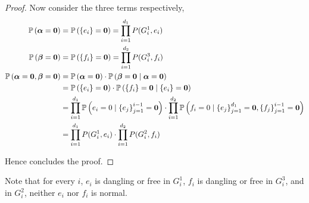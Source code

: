 \begin{proof}
Now consider the three terms respectively,
	\begin{align*}
		\mathbb{P}\left( \boldsymbol\alpha = \mathbf{0}\right) &= \mathbb{P} \left( \left\{e_i\right\} = \mathbf{0}\right) =	\prod_{i=1}^{d_1} P(G_i^1, e_i) \\
		\mathbb{P}\left( \boldsymbol\beta = \mathbf{0}\right) &= \mathbb{P} \left( \left\{f_i\right\} = \mathbf{0}\right) =	\prod_{i=1}^{d_2} P(G_i^3, f_i) \\
		\mathbb{P}\left( \boldsymbol\alpha = \mathbf{0}, \boldsymbol\beta = \mathbf{0} \right) &=  \mathbb{P} \left( \boldsymbol\alpha = \mathbf{0} \right) \cdot \mathbb{P}\left( \boldsymbol\beta = \mathbf{0} \mid \boldsymbol\alpha = \mathbf{0} \right) \\
		&=  \mathbb{P} \left( \left\{e_i\right\} = \mathbf{0}\right) \cdot \mathbb{P} \left( \left\{f_i\right\} = \mathbf{0} \mid \left\{e_i\right\} = \mathbf{0} \right) \\
		&= \prod_{i=1}^{d_1} \mathbb{P} \left( e_i = 0 \mid \left\{e_j\right\}_{j=1}^{i-1} = \mathbf{0} \right) \cdot \prod_{i=1}^{d_2} \mathbb{P} \left( f_i = 0 \mid \left\{e_j\right\}_{j=1}^{d_1} = \mathbf{0},\left\{f_j\right\}_{j=1}^{i-1} = \mathbf{0} \right) \\
		&= \prod_{i=1}^{d_1} P(G_i^1, e_i) \cdot \prod_{i=1}^{d_2} P(G_i^2, f_i)
	\end{align*}

	Hence concludes the proof.
\end{proof}

Note that for every $i$, $e_i$ is dangling or free in $G_i^1$, $f_i$ is dangling or free in $G_i^3$, and in $G_i^2$, neither $e_i$ nor $f_i$ is normal.

